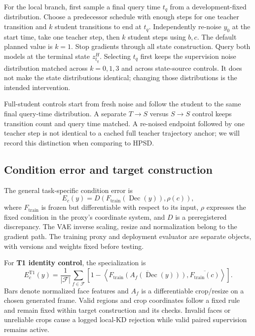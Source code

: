 \documentclass[11pt]{article}
\begin{document}
For the local branch, first sample a final query time $t_q$ from a development-fixed distribution. Choose a predecessor schedule with enough steps for one teacher transition and $k$ student transitions to end at $t_q$. Independently re-noise $y_0$ at the start time, take one teacher step, then $k$ student steps using $b,c$. The default planned value is $k=1$. Stop gradients through all state construction. Query both models at the terminal state $z_{t_q}^{H}$. Selecting $t_q$ first keeps the supervision noise distribution matched across $k=0,1,3$ and across state-source controls. It does not make the state distributions identical; changing those distributions is the intended intervention.

Full-student controls start from fresh noise and follow the student to the same final query-time distribution. A separate $T\!\to\!S$ versus $S\!\to\!S$ control keeps transition count and query time matched. A re-noised endpoint followed by one teacher step is not identical to a cached full teacher trajectory anchor; we will record this distinction when comparing to HPSD.

\subsection{Condition error and target construction}
The general task-specific condition error is
\begin{equation}
 E_c(y)=D\!\left(F_{\mathrm{train}}(\operatorname{Dec}(y)),\rho(c)\right),
 \label{eq:general_condition}
\end{equation}
where $F_{\mathrm{train}}$ is frozen but differentiable with respect to its input, $\rho$ expresses the fixed condition in the proxy's coordinate system, and $D$ is a preregistered discrepancy. The VAE inverse scaling, resize and normalization belong to the gradient path. The training proxy and deployment evaluator are separate objects, with versions and weights fixed before testing.

For \textbf{T1 identity control}, the specialization is
\begin{equation}
 E_c^{\mathrm{T1}}(y)=\frac{1}{|\mathcal F|}\sum_{f\in\mathcal F}
 \left[1-\left\langle \overline{F_{\mathrm{train}}(A_f(\operatorname{Dec}(y)))},
 \overline{F_{\mathrm{train}}(c)}\right\rangle\right].
\end{equation}
Bars denote normalized face features and $A_f$ is a differentiable crop/resize on a chosen generated frame. Valid regions and crop coordinates follow a fixed rule and remain fixed within target construction and its checks. Invalid faces or unreliable crops cause a logged local-KD rejection while valid paired supervision remains active.
\end{document}
